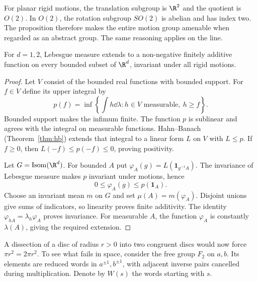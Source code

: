 For planar rigid motions, the translation subgroup is $\R^2$ and the quotient is $O(2)$. In $O(2)$, the rotation subgroup $SO(2)$ is abelian and has index two. The proposition therefore makes the entire motion group amenable when regarded as an abstract group. The same reasoning applies on the line.

\begin{theorem}[Banach, 1923]\label{thm:banachmeasure}
For $d=1,2$, Lebesgue measure extends to a non-negative finitely additive function on every bounded subset of $\R^d$, invariant under all rigid motions.
\end{theorem}
\begin{proof}
Let $V$ consist of the bounded real functions with bounded support. For $f\in V$ define its upper integral by
\[p(f)=\inf\left\{\int h\dd\lambda:h\in V\text{ measurable},\ h\ge f\right\}.\]
Bounded support makes the infimum finite. The function $p$ is sublinear and agrees with the integral on measurable functions. Hahn--Banach (Theorem~\ref{thm:hb}) extends that integral to a linear form $L$ on $V$ with $L\le p$. If $f\ge0$, then $L(-f)\le p(-f)\le0$, proving positivity.

Let $G=\mathrm{Isom}(\R^d)$. For bounded $A$ put $\varphi_A(g)=L(\mathbf1_{g^{-1}A})$. The invariance of Lebesgue measure makes $p$ invariant under motions, hence
\[0\le\varphi_A(g)\le p(\mathbf1_A).\]
Choose an invariant mean $m$ on $G$ and set $\mu(A)=m(\varphi_A)$. Disjoint unions give sums of indicators, so linearity proves finite additivity. The identity $\varphi_{hA}=\lambda_h\varphi_A$ proves invariance. For measurable $A$, the function $\varphi_A$ is constantly $\lambda(A)$, giving the required extension.
\end{proof}

A dissection of a disc of radius $r>0$ into two congruent discs would now force $\pi r^2=2\pi r^2$. To see what fails in space, consider the free group $F_2$ on $a,b$. Its elements are reduced words in $a^{\pm1},b^{\pm1}$, with adjacent inverse pairs cancelled during multiplication. Denote by $W(s)$ the words starting with $s$.

